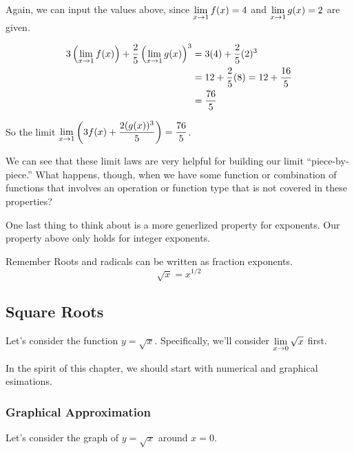 \begin{enumerate}
  Again, we can input the values above, since $\displaystyle \lim_{x\to1} f(x) = 4$ and $\displaystyle \lim_{x\to 1}g(x) = 2$ are given.

  \begin{align*}
    3\left(\displaystyle \lim_{x\to 1} f(x)\right) + \dfrac{2}{5}\left(\displaystyle \lim_{x\to 1}g(x)\right)^3 & =3(4) + \dfrac{2}{5}(2)^3 \\
    &= 12 + \dfrac{2}{5}(8) = 12 + \dfrac{16}{5}\\
    & = \dfrac{76}{5}
  \end{align*}

  So the limit $\displaystyle \lim_{x\to 1} \left(3f(x)+\dfrac{2(g(x))^3}{5}\right) = \dfrac{76}{5}$.
\end{enumerate}

We can see that these limit laws are very helpful for building our limit ``piece-by-piece.''
What happens, though, when we have some function or combination of functions that involves an operation or function type that is not covered in these properties?

One last thing to think about is a more generlized property for exponents.
Our property above only holds for integer exponents.

\begin{note}{Remember}
  Roots and radicals can be written as fraction exponents.
  \[\sqrt{x} = x^{1/2}\]
\end{note}

\subsection*{Square Roots}

Let's consider the function $y=\sqrt{x}$.
Specifically, we'll consider $\displaystyle \lim_{x\to 0} \sqrt{x}$ first.

In the spirit of this chapter, we should start with numerical and graphical esimations.

\subsubsection*{Graphical Approximation}

Let's consider the graph of $y=\sqrt{x}$ around $x=0$.

